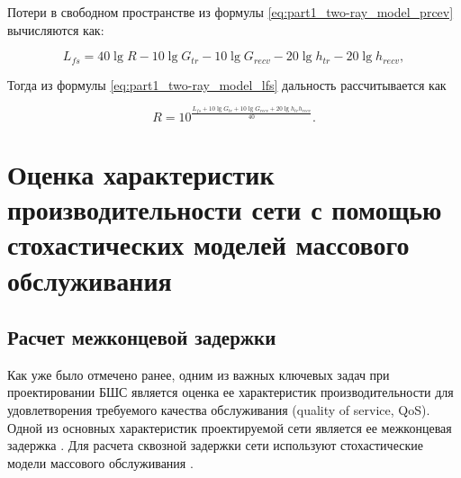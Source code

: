 Потери в свободном пространстве из формулы \cref{eq:part1_two-ray_model_prcev} вычисляются как:

\begin{equation}
  \label{eq:part1_two-ray_model_lfs}
  L_{fs} = 40\lg{R} - 10\lg{G_{tr}} - 10\lg{G_{recv}} - 20\lg{h_{tr}} - 20\lg{h_{recv}},
\end{equation}

Тогда из формулы \cref{eq:part1_two-ray_model_lfs} дальность рассчитывается как

\begin{equation}
  \label{eq:part1_two-ray_model_r}
  R = 10^\frac{L_{fs} + 10\lg{G_{tr}} + 10\lg{G_{recv}} + 20\lg{h_{tr}h_{recv}}}{40}.
\end{equation}



\subsection{}

\section{Оценка характеристик производительности сети с помощью стохастических моделей массового обслуживания}

\subsection{}

\subsection{Расчет межконцевой задержки}\label{part4_e2e_delay_section}

Как уже было отмечено ранее, одним из важных ключевых задач при проектировании БШС является оценка ее характеристик производительности для удовлетворения требуемого качества обслуживания (quality of service, QoS). Одной из основных характеристик проектируемой сети является ее межконцевая задержка \cite{Vishnevsky2016_Methods_of_performance, Wang2017, Liu2016, Chen2019, Hosni2017, Capone2019, Abbas2017, Seliem2019, Malandra2018, Kalor2018, Larionov2019, Gao2016}. Для расчета сквозной задержки сети используют стохастические модели массового обслуживания \cite{Vishnevsky2016_Methods_of_performance, Wang2017, Liu2016, Malandra2018, Larionov2019, Gao2016}. 

